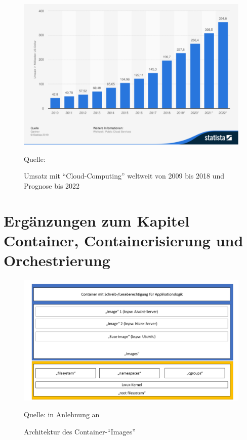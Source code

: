 \begin{figure}[H]
	\centering
	\includegraphics[scale=0.43]{img/statistic_id195760_prognose-zum-umsatz-mit-cloud-computing-weltweit-bis-2022.pdf}
	\caption{Umsatz mit \enquote{Cloud-Computing} weltweit von 2009 bis 2018 und Prognose bis 2022 }
	{\footnotesize Quelle: \cite{gartner_cloud_2019}}
	\label{abb:umsatzprognoseCC}
\end{figure}

\section{Ergänzungen zum Kapitel Container, Containerisierung und Orchestrierung}

\begin{figure}[H]
	\centering
	\includegraphics[scale=0.45]{img/containerImageArch.pdf}
	\caption{Architektur des Container-\enquote{Images}}
	{\footnotesize Quelle: in Anlehnung an \cite{pahl_containerization_2015}}
	\label{abb:containerArch}
\end{figure}

